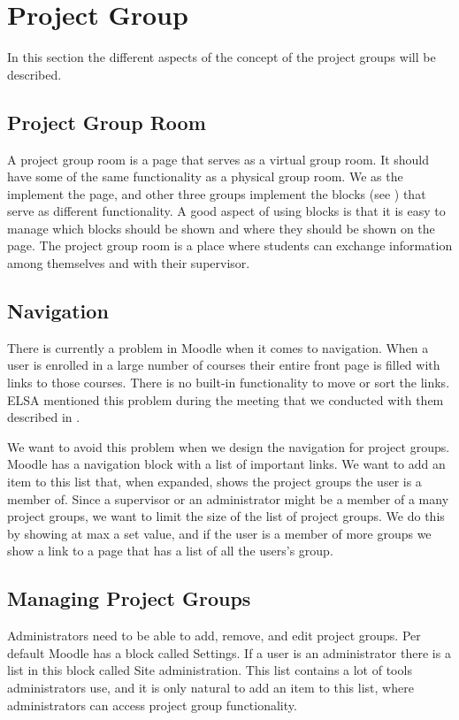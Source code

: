 \section{Project Group}
In this section the different aspects of the concept of the project groups will be described.
\subsection{Project Group Room}
A project group room is a page that serves as a virtual group room. 
It should have some of the same functionality as a physical group room.
We as the \groupname{} implement the page, and other three groups implement the blocks (see ) that serve as different functionality.
A good aspect of using blocks is that it is easy to manage which blocks should be shown and where they should be shown on the page.
The project group room is a place where students can exchange information among themselves and with their supervisor.


\subsection{Navigation}
There is currently a problem in Moodle when it comes to navigation. 
When a user is enrolled in a large number of courses their entire front page is filled with links to those courses.
There is no built-in functionality to move or sort the links.
ELSA mentioned this problem during the meeting that we conducted with them described in .

We want to avoid this problem when we design the navigation for project groups.
Moodle has a navigation block with a list of important links.
We want to add an item to this list that, when expanded, shows the project groups the user is a member of.
Since a supervisor or an administrator might be a member of a many project groups, we want to limit the size of the list of project groups.
We do this by showing at max a set value, and if the user is a member of more groups we show a link to a page that has a list of all the users's group.

\subsection{Managing Project Groups}
Administrators need to be able to add, remove, and edit project groups.
Per default Moodle has a block called Settings. 
If a user is an administrator there is a list in this block called Site administration. 
This list contains a lot of tools administrators use, and it is only natural to add an item to this list, where administrators can access project group functionality.


